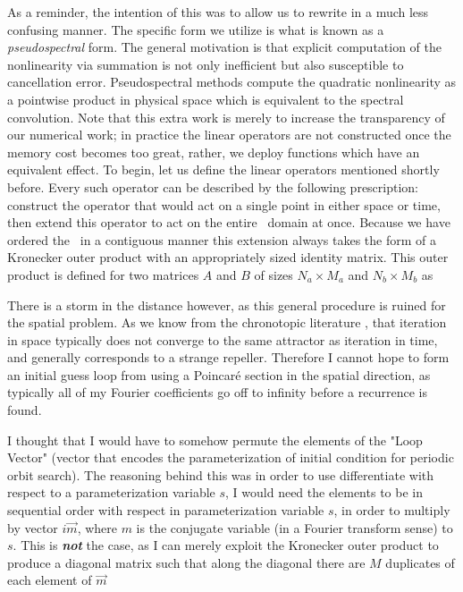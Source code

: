As a reminder, the intention of this was to allow us
to rewrite  in a much less confusing manner.
The specific form we utilize is what is known as
a \emph{pseudospectral} form. The general motivation
is that explicit computation of the nonlinearity via
summation is not only inefficient but also susceptible to cancellation error.
Pseudospectral methods compute the
quadratic nonlinearity as a pointwise product in physical space
which is equivalent to the spectral convolution.
Note that this
extra work is merely to increase the transparency of our numerical
work; in practice the linear operators
are not constructed once the memory cost becomes
too great, rather, we deploy functions which have an equivalent effect.
To begin, let us define the linear operators mentioned shortly before.
Every such operator can be described by the following prescription:
construct the operator that would act on a single point in either
space or time, then extend this operator to act on
the entire \spt\ domain at once. Because we have ordered the \Fcs\
in a contiguous manner this extension always takes the form
of a Kronecker outer product with an appropriately sized identity matrix.
This outer product is defined for two matrices $A$ and $B$ of sizes
$N_a \times M_a$ and $N_b \times M_b$ as

There is a storm in the distance however, as this general procedure is ruined for the spatial problem.
As we know from the chronotopic literature \refrefs{LePoTo96, LePoTo97, PoToLe98, GiLePo95},
that iteration in space typically does not converge to the same attractor as iteration in time,
and generally corresponds to a strange repeller. Therefore I cannot hope to form an initial
guess loop from using a Poincar\'e section in the spatial direction, as typically all of my
Fourier coefficients go off to infinity before a recurrence is found.

I thought that I would have to somehow permute the elements  of the "Loop Vector" (vector that
encodes the parameterization of initial condition for periodic orbit search). The reasoning behind this
was in order to use differentiate with respect to a parameterization variable $s$, I would need
the elements to be in sequential order with respect in parameterization variable $s$, in order to
multiply by vector $i \vec{m}$, where $m$ is the conjugate variable (in a Fourier transform sense)
to $s$. This is \textbf{\emph{not}}
the case, as I can merely exploit the Kronecker outer product to produce a diagonal matrix such that
along the diagonal there are $M$ duplicates of each element of $\vec{m}$

